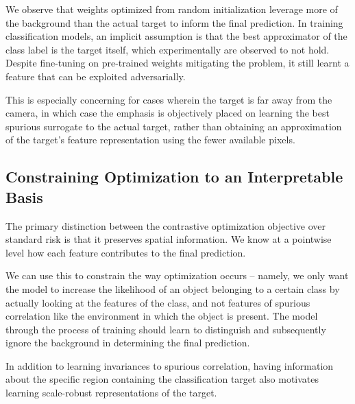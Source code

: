 \documentclass{article}
\theoremstyle{plain}
\theoremstyle{definition}
\theoremstyle{remark}
\begin{document}
We observe that weights optimized from random initialization leverage more of the background than the actual target to inform the final prediction. In training classification models, an implicit assumption is that the best approximator of the class label is the target itself, which experimentally are observed to not hold. Despite fine-tuning on pre-trained weights mitigating the problem, it still learnt a feature that can be exploited adversarially.

This is especially concerning for cases wherein the target is far away from the camera, in which case the emphasis is objectively placed on learning the best spurious surrogate to the actual target, rather than obtaining an approximation of the target's feature representation using the fewer available pixels.


\subsection{Constraining Optimization to an Interpretable Basis}
\label{sec:constraining-optimization}

The primary distinction between the contrastive optimization objective over standard risk is that it preserves spatial information. We know at a pointwise level how each feature contributes to the final prediction.

We can use this to constrain the way optimization occurs -- namely, we only want the model to increase the likelihood of an object belonging to a certain class by actually looking at the features of the class, and not features of spurious correlation like the environment in which the object is present. The model through the process of training should learn to distinguish and subsequently ignore the background in determining the final prediction.


In addition to learning invariances to spurious correlation, having information about the specific region containing the classification target also motivates learning scale-robust representations of the target. 
\end{document}
